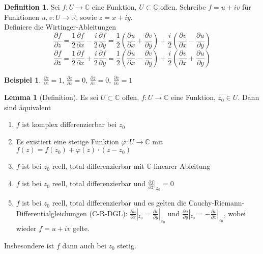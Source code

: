 \documentclass[11pt,titlepage]{article}
\theoremstyle{definition}
\newtheorem{lemma}[theorem]{Lemma}
\newtheorem{definition}[theorem]{Definition}
\newtheorem{example}[theorem]{Beispiel}
\theoremstyle{remark}
\begin{document}
	\begin{definition}
		Sei $f:U\to\mathbb{C}$ eine Funktion, $U\subset\mathbb{C}$ offen. Schreibe $f=u+iv$ für 
		Funktionen $u,v:U\to\mathbb{R}$, sowie $z=x+iy$. \\
		Definiere die Wirtinger-Ableitungen 
		\[ \frac{\partial f}{\partial z}=\frac{1}{2}\frac{\partial f}{\partial x} -\frac{i}{2}\frac{\partial f}{\partial y} 
		=\frac{1}{2} \left(\frac{\partial u}{\partial x}+\frac{\partial v}{\partial y}\right)+\frac{i}{2}\left(
		\frac{\partial v}{\partial x}-\frac{\partial u}{\partial y}\right) \]
		\[ \frac{\partial f}{\partial \overline{z}}=\frac{1}{2} \frac{\partial f}{\partial x} +\frac{i}{2}
		\frac{\partial f}{\partial y}=\frac{1}{2}\left( \frac{\partial u}{\partial x}-\frac{\partial v}{\partial y}\right)
		+\frac{i}{2}\left(\frac{\partial v}{\partial x}+\frac{\partial u}{\partial y}\right) \]
	\end{definition}
	
	\begin{example}
		$\frac{\partial z}{\partial z}=1$, $\frac{\partial z}{\partial \overline{z}}=0$, 
		$\frac{\partial\overline{z}}{\partial z}=0$, $\frac{\partial\overline{z}}{\partial\overline{z}}=1$
	\end{example}
	
	\begin{lemma}[Definition]
		Es sei $U\subset\mathbb{C}$ offen, $f:U\to\mathbb{C}$ eine Funktion, $z_0\in U$. Dann sind 
		äquivalent
		\begin{enumerate}
			\item $f$ ist komplex differenzierbar bei $z_0$
			\item Es existiert eine stetige Funktion $\varphi:U\to\mathbb{C}$ mit $f(z)=f(z_0)+\varphi(z)
			\cdot (z-z_0)$
			\item $f$ ist bei $z_0$ reell, total differenzierbar mit $\mathbb{C}$-linearer Ableitung
			\item $f$ ist bei $z_0$ reell, total differenzierbar und $\frac{\partial f}{\partial \overline{z}}|_
			{z_0}=0$
			\item $f$ ist bei $z_0$ reell, total differenzierbar und es gelten die Cauchy-Riemann-
			Differentialgleichungen (C-R-DGL): 
			$\frac{\partial u}{\partial x}|_{z_0}=\frac{\partial v}{\partial y}|_{z_0}$ 
			und $\frac{\partial u}{\partial y}|_{z_0}=-\frac{\partial v}{\partial x}|_{z_0}$, wobei wieder 
			$f=u+iv$ gelte.
		\end{enumerate}
		Insbesondere ist $f$ dann auch bei $z_0$ stetig.
	\end{lemma}
	
\end{document}
